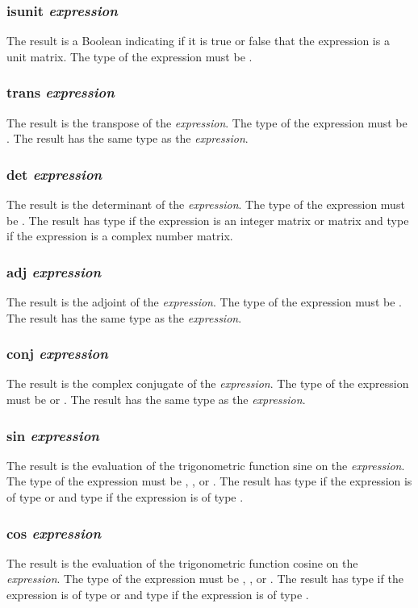 \subsubsection{isunit \textit{expression}}
The result is a Boolean indicating if it is true or false that the expression is a unit matrix. The type of the expression must be \mat.
\subsubsection{trans \textit{expression}}
The result is the transpose of the \textit{expression}. The type of the expression must be \mat. The result has the same type as the \textit{expression}.
\subsubsection{det \textit{expression}}
The result is the determinant of the \textit{expression}. The type of the expression must be \mat. The result has type \float if the expression is an integer matrix or \float matrix and type \complex if the expression is a complex number matrix.
\subsubsection{adj \textit{expression}}
The result is the adjoint of the \textit{expression}. The type of the expression must be \mat. The result has the same type as the \textit{expression}.
\subsubsection{conj \textit{expression}}
The result is the complex conjugate of the \textit{expression}. The type of the expression must be \complex or \mat. The result has the same type as the \textit{expression}.
\subsubsection{sin \textit{expression}}
The result is the evaluation of the trigonometric function sine on the \textit{expression}. The type of the expression must be \integ, \float, or  \complex. The result has type \float if the expression is of type \integ or \float and type \complex if the expression is of type  \complex.
\subsubsection{cos \textit{expression}}
The result is the evaluation of the trigonometric function cosine on the \textit{expression}. The type of the expression must be \integ, \float, or  \complex. The result has type \float if the expression is of type \integ or \float and type \complex if the expression is of type  \complex.
